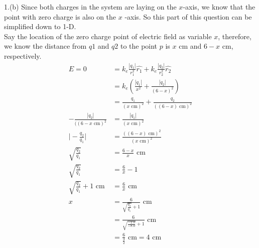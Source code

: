 \documentclass[11pt]{article}
\begin{document}
1.(b) 
Since both charges in the system are laying on the \(x\)-axis, we know that the point with zero charge is also on the \(x\) -axis. So this part of this question can be simplified down to 1-D. \\
Say the location of the zero charge point of electric field as variable \(x\), therefore, we know the distance from \(q1\) and \(q2\) to the point \(p\) is \(x\) cm and \(6-x\) cm, respectively. \\
\begin{align*}
              E = 0 &= k_{e} \frac{| q_{1} |}{r_{1}^{2}} \hat{r_{1}} + k_{e} \frac{| q_{2} |}{r_{2}^{2}} \hat{r_{2}} \\
                    &= k_{e} ( \frac{| q_{1} |}{x^{2}} + \frac{| q_{2} |}{(6-x)^{2}} ) \\
                    &= \frac{q_{1}}{( x \text{ cm} )^{2}} + \frac{q_{2}}{( (6-x) \text{ cm} )^{2}} \\
- \frac{| q_{2} |}{( (6-x \text{ cm} )^{2}} &= \frac{| q_{1} |}{( x \text{ cm} )^{2}} \\
\bigg | -\frac{q_{2}}{q_{1}} \bigg | &= \frac{( (6-x) \text{ cm} )^{2}}{( x \text{ cm} )^{2}} \\
\sqrt{ \tfrac{q_{2}}{q_{1}} } &= \frac{6-x}{x} \text{ cm} \\
\sqrt{ \tfrac{q_{2}}{q_{1}} } &= \frac{6}{x} - 1 \\
\sqrt{ \tfrac{q_{2}}{q_{1}} } + 1 \text{ cm} &= \frac{6}{x} \text{ cm} \\
x &= \tfrac{6}{ \sqrt{ \frac{q_{2}}{q_{1}} } + 1 } \text{ cm} \\
  &= \tfrac{6}{ \sqrt{ \frac{-2.0}{-8.0} } + 1 } \text{ cm} \\
  &= \frac{6}{ \frac{3}{2} } \text{ cm} = 4 \text{ cm}
\end{align*}
\end{document}
